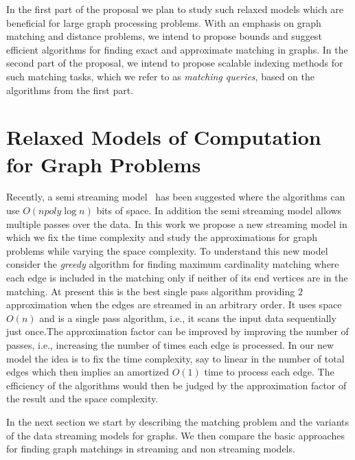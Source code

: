 In the first part of the proposal we plan to study such relaxed models which are beneficial for large graph processing problems. With an emphasis on graph matching and distance problems, we intend to propose bounds and suggest efficient algorithms for finding exact and approximate matching in graphs. In the second part of the proposal, we intend to propose scalable indexing methods for such matching tasks, which we refer to as \emph{matching queries}, based on the algorithms from the first part.

\section{Relaxed Models of Computation for Graph Problems}
%

Recently, a semi streaming model~\cite{Muthukrishnan03} has been suggested where the algorithms can use $O(n poly \log n)$ bits of space. In addition the semi streaming model allows multiple passes over the data.  In this work we propose a new streaming model in which we fix the time complexity and study the approximations for graph problems while varying the space complexity. To understand this new model consider the \emph{greedy} algorithm for finding maximum cardinality matching where each edge is included in the matching only if neither of its end vertices are in the matching. At present this is the best single pass algorithm providing $2$ approximation when the edges are streamed in an arbitrary order. It uses space $O(n)$ and is a single pass algorithm, i.e., it scans the input data sequentially just once.The approximation factor can be improved by improving the number of passes, i.e., increasing the number of times each edge is processed. In our new model the idea is to fix the time complexity, say to linear in the number of total edges which then implies an amortized $O(1)$ time to process each edge. The efficiency of the algorithms would then be judged by the approximation factor of the result and the space complexity.  

In the next section we start by describing the matching problem and the variants of the data streaming models for graphs. We then compare the basic approaches for finding graph matchings in streaming and non streaming models.

